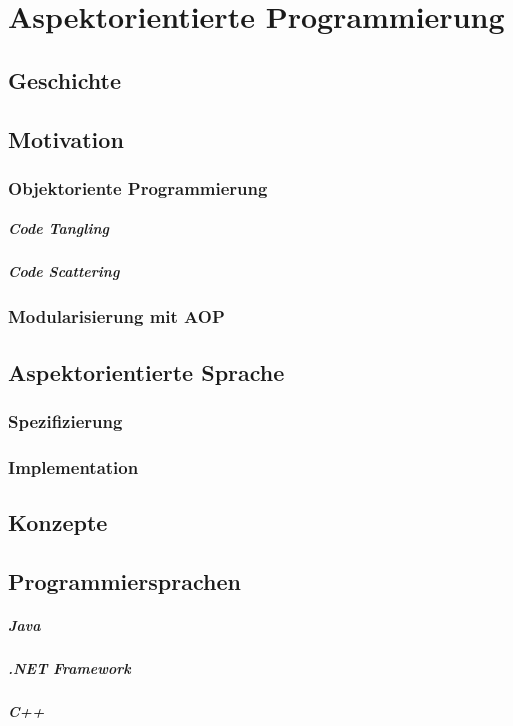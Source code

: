 \chapter{Aspektorientierte Programmierung}
\label{chap:aop}

\section{Geschichte}
\label{sec:aop_geschichte}

\section{Motivation}
\label{sec:aop_motivation}

\subsection{Objektoriente Programmierung}
\label{sec:aop_oop}

\paragraph{Code Tangling}

\paragraph{Code Scattering}

\subsection{Modularisierung mit AOP}
\label{sec:aop_modaop}


\section{Aspektorientierte Sprache}
\label{sec:aop_lang}

\subsection{Spezifizierung}

\subsection{Implementation}

\section{Konzepte}

\section{Programmiersprachen}

\paragraph{Java}

\paragraph{.NET Framework}

\paragraph{C++}